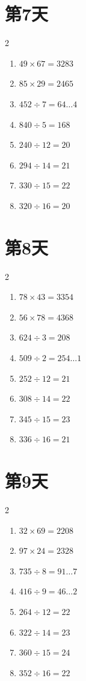 \documentclass[12pt]{ctexart}
\begin{document}
	\section*{第7天}
	\begin{multicols}{2}
		\begin{enumerate}[itemsep=0pt]
			\item $49 \times 67 = 3283$
			\item $85 \times 29 = 2465$
			\item $452 \div 7 = 64\ldots 4$
			\item $840 \div 5 = 168$
			\item $240 \div 12 = 20$
			\item $294 \div 14 = 21$
			\item $330 \div 15 = 22$
			\item $320 \div 16 = 20$
		\end{enumerate}
	\end{multicols}
	
	\section*{第8天}
	\begin{multicols}{2}
		\begin{enumerate}[itemsep=0pt]
			\item $78 \times 43 = 3354$
			\item $56 \times 78 = 4368$
			\item $624 \div 3 = 208$
			\item $509 \div 2 = 254\ldots 1$
			\item $252 \div 12 = 21$
			\item $308 \div 14 = 22$
			\item $345 \div 15 = 23$
			\item $336 \div 16 = 21$
		\end{enumerate}
	\end{multicols}
	
	\section*{第9天}
	\begin{multicols}{2}
		\begin{enumerate}[itemsep=0pt]
			\item $32 \times 69 = 2208$
			\item $97 \times 24 = 2328$
			\item $735 \div 8 = 91\ldots 7$
			\item $416 \div 9 = 46\ldots 2$
			\item $264 \div 12 = 22$
			\item $322 \div 14 = 23$
			\item $360 \div 15 = 24$
			\item $352 \div 16 = 22$
		\end{enumerate}
	\end{multicols}
	
\end{document}
